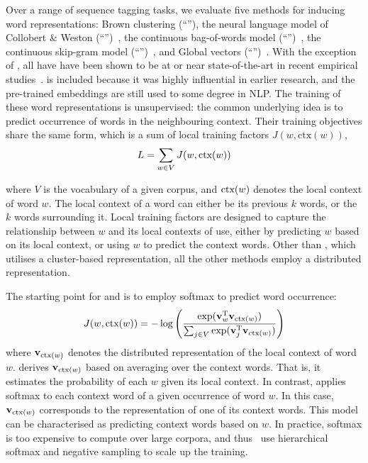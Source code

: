 Over a range of sequence tagging tasks, we evaluate five methods for
inducing word representations: Brown clustering
\cite{Brown92class-basedn-gram} (``\brown''), the neural language model
of Collobert \& Weston (``\CW'')~\cite{collobert2011natural}, the
continuous bag-of-words model (``\CBOW'')~\cite{Mikolov13}, the continuous
skip-gram model (``\Skipgram'')~\cite{Mikolov13NIPS}, and Global vectors
(``\Glove'')~\cite{pennington2014glove}. With the exception of \CW, all have
have been shown to be at or near state-of-the-art in recent empirical
studies~\cite{turian2010word,pennington2014glove}. \CW is included
because it was highly influential in earlier research, and the pre-trained embeddings are
still used to some degree in NLP. The training of these word
representations is unsupervised: the common underlying idea is to
predict occurrence of words in the neighbouring context. Their training
objectives share the same form, which is a sum of local training factors
$J(w, \text{ctx}(w))$,  
\begin{displaymath}
  L = \sum_{w \in V} J(w, \text{ctx}(w))
\end{displaymath}

where $V$ is the vocabulary of a given corpus, and $\text{ctx}(w)$ denotes the
local context of word $w$.
The local context of a word can either be its previous $k$ words, or the
$k$ words surrounding it. 
Local training factors are designed to capture the relationship between
$w$ and its local contexts of use, either by predicting $w$
based on its local context, or using $w$ to predict the
context words. Other than \brown, which utilises a cluster-based
representation, all the other methods employ a distributed representation.

The starting point for \CBOW and \Skipgram is to employ softmax to predict word occurrence:
\begin{displaymath}
  J(w, \text{ctx}(w)) = - \log \left( \frac{\exp(\mathbf{v}_w^{\text{T}} \mathbf{v}_{\text{ctx}(w)})}{ \sum_{j \in V} \exp(\mathbf{v}_j^{\text{T}} \mathbf{v}_{\text{ctx}(w)})} \right)
\end{displaymath}
where $\mathbf{v}_{\text{ctx}(w)}$ denotes the distributed representation of
the local context of word $w$. \CBOW derives $\mathbf{v}_{\text{ctx}(w)}$
based on averaging over the context words. That is, it estimates the
probability of each $w$ given its local
context. In contrast, \Skipgram applies softmax to each context word of
a given occurrence of word $w$. In this case, $\mathbf{v}_{\text{ctx}(w)}$ corresponds to the
representation of one of its context words. This model can be characterised as
predicting context words based on $w$. In practice, softmax is
too expensive to compute over large corpora, and thus~ use
hierarchical softmax and negative sampling to scale up the training.

